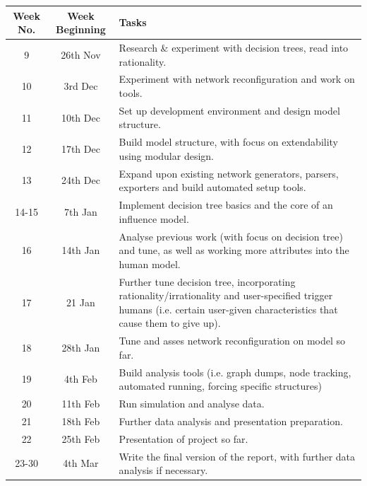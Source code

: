 \documentclass[]{article}
\begin{document}
\begin{landscape}
\begin{table}
	\centering
		\begin{tabular}{|c|c|p{12cm}|}
		\hline
			Week No. & Week Beginning & Tasks \\
			\hline
			9 & 26th Nov & Research \& experiment with decision trees, read into rationality. \\
			\hline
			10 & 3rd Dec & Experiment with network reconfiguration and work on tools. \\
			\hline
			11 & 10th Dec & Set up development environment and design model structure. \\
			\hline
			12 & 17th Dec & Build model structure, with focus on extendability using modular design. \\
			\hline
			13 & 24th Dec & Expand upon existing network generators, parsers, exporters and build automated setup tools. \\
			\hline
			14-15 & 7th Jan & Implement decision tree basics and the core of an influence model. \\
			\hline
			16 & 14th Jan & Analyse previous work (with focus on decision tree) and tune, as well as working more attributes into the human model. \\
			\hline
			17 & 21 Jan & Further tune decision tree, incorporating rationality/irrationality and user-specified trigger humans (i.e. certain user-given characteristics that cause them to give up). \\
			\hline
			18 & 28th Jan & Tune and asses network reconfiguration on model so far.\\
			\hline
			19 & 4th Feb & Build analysis tools (i.e. graph dumps, node tracking, automated running, forcing specific structures)\\
			\hline 
			20 & 11th Feb & Run simulation and analyse data.\\
			\hline
			21 & 18th Feb & Further data analysis and presentation preparation.\\
			\hline
			22 & 25th Feb & Presentation of project so far.\\
			\hline
			23-30 & 4th Mar & Write the final version of the report, with further data analysis if necessary.\\
			\hline
		\end{tabular}
		\label{timetable}
\end{table}
\end{landscape}




\end{document}
